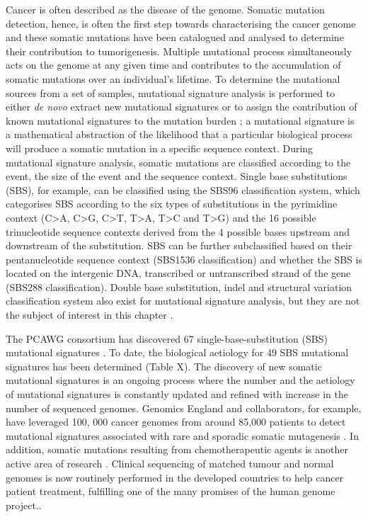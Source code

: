 Cancer is often described as the disease of the genome. Somatic mutation detection, hence, is often the first step towards characterising the cancer genome and these somatic mutations have been catalogued and analysed to determine their contribution to tumorigenesis. Multiple mutational process simultaneously acts on the genome at any given time and contributes to the accumulation of somatic mutations over an individual’s lifetime. To determine the mutational sources from a set of samples, mutational signature analysis is performed to either \textit{de novo} extract new mutational signatures or to assign the contribution of known mutational signatures to the mutation burden \cite{Alexandrov2013-fq}; a mutational signature is a mathematical abstraction of the likelihood that a particular biological process will produce a somatic mutation in a specific sequence context. During mutational signature analysis, somatic mutations are classified according to the event, the size of the event and the sequence context. Single base substitutions (SBS), for example, can be classified using the SBS96 classification system, which categorises SBS according to the six types of substitutions in the pyrimidine context (C>A, C>G, C>T, T>A, T>C and T>G) and the 16 possible trinucleotide sequence contexts derived from the 4 possible bases upstream and downstream of the substitution. SBS can be further subclassified based on their pentanucleotide sequence context (SBS1536 classification) and whether the SBS is located on the intergenic DNA, transcribed or untranscribed strand of the gene (SBS288 classification). Double base substitution, indel and structural variation classification system also exist for mutational signature analysis, but they are not the subject of interest in this chapter \cite{Alexandrov2013-fq, Li2020-vw, Steele2022-mn}. 

The PCAWG consortium has discovered 67 single-base-substitution (SBS) mutational signatures \cite{Alexandrov2020-ys}. To date, the biological aetiology for 49 SBS mutational signatures has been determined (Table X). The discovery of new somatic mutational signatures is an ongoing process where the number and the aetiology of mutational signatures is constantly updated and refined with increase in the number of sequenced genomes. Genomics England and collaborators, for example, have leveraged 100, 000 cancer genomes from around 85,000 patients to detect mutational signatures associated with rare and sporadic somatic mutagenesis \cite{Degasperi2022-qe}. In addition, somatic mutations resulting from chemotherapeutic agents is another active area of research \cite{Pich2019-ja, Aitken2020-sa}. Clinical sequencing of matched tumour and normal genomes is now routinely performed in the developed countries to help cancer patient treatment, fulfilling one of the many promises of the human genome project..

